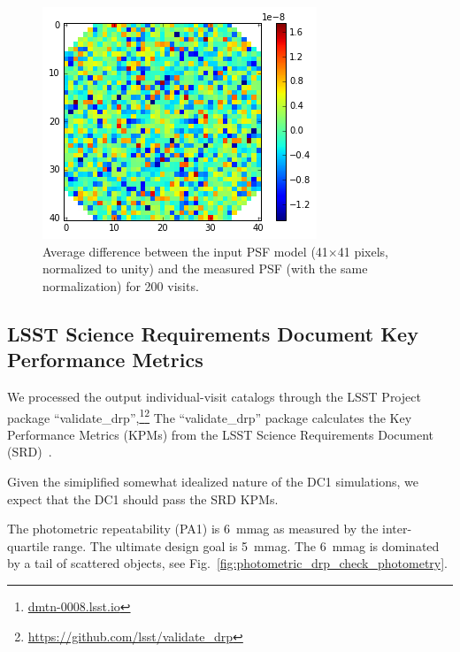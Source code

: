 \documentclass[\docopts]{\docclass}
\begin{document}
\begin{figure}
\centering
\includegraphics[width=0.9\columnwidth]{psf_residual.png}
\caption{Average difference between the input PSF model (41$\times$41 pixels, normalized to unity) and the measured PSF (with the same normalization) for 200 visits.}
\label{fig:psf_residual}
\end{figure}

\subsection{LSST Science Requirements Document Key Performance Metrics}

We processed the output individual-visit catalogs through the LSST Project package ``validate_drp'',\footnote{\url{dmtn-0008.lsst.io}}\footnote{\url{https://github.com/lsst/validate_drp}}
The ``validate_drp'' package calculates the Key Performance Metrics (KPMs) from the LSST Science Requirements Document (SRD)~\citep{LPM-17}.

Given the simiplified somewhat idealized nature of the DC1 simulations, we expect that the DC1 should pass the SRD KPMs.

The photometric repeatability (PA1) is 6~mmag as measured by the inter-quartile range.  The ultimate design goal is 5~mmag.  The 6~mmag is dominated by a tail of scattered objects, see Fig.~\ref{fig:photometric_drp_check_photometry}.
\end{document}
